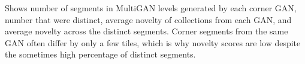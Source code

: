 



\begin{table}[t!]
\caption{\label{tab:cornernovelty} Distinct Corner Segments in MultiGAN}
{\small Shows number of segments in MultiGAN levels generated by each corner GAN, number that were distinct, average novelty of collections from each GAN, and average novelty across the distinct segments. Corner segments from the same GAN often differ by only a few tiles, which is why novelty scores are low despite the sometimes high percentage of distinct segments.}
\centering
{}
\end{table}


